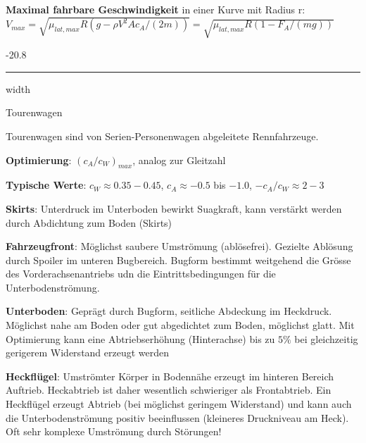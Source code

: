 \documentclass[8pt, landscape, fleqn]{scrartcl}
\makeatletter
\renewcommand{\subsubsection}{\@startsection{subsubsection}{1}{0mm}%
{-2\baselineskip}{0.8\baselineskip}%
{\hrule depth 0.2pt width\columnwidth\vspace*{1.2em}\normalsize\bfseries\rmfamily}}
\makeatother
\begin{document}
\begin{multicols*}{3}
\textbf{Maximal fahrbare Geschwindigkeit} in einer Kurve mit Radius r:
$V_{max} = \sqrt{\mu_{lat,max}R(g-\rho V^2 A c_A / (2m))} = \sqrt{\mu_{lat,max} R (1- F_A/(mg))}$

\subsubsection{Tourenwagen}

Tourenwagen sind von Serien-Personenwagen abgeleitete Rennfahrzeuge. \newline \newline

\textbf{Optimierung}: $(c_A / c_W)_{max}$, analog zur Gleitzahl \newline \newline

\textbf{Typische Werte}: $c_W \approx 0.35 - 0.45$, $c_A \approx -0.5$ bis $-1.0$, $-c_A/c_W \approx 2-3$ \newline \newline

\textbf{Skirts}: Unterdruck im Unterboden bewirkt Suagkraft, kann verstärkt werden durch Abdichtung zum Boden (Skirts) \newline \newline

\textbf{Fahrzeugfront}: Möglichst saubere Umströmung (ablösefrei). Gezielte Ablösung durch Spoiler im unteren Bugbereich. Bugform bestimmt weitgehend die Grösse des Vorderachsenantriebs udn die Eintrittsbedingungen für die Unterbodenströmung.  \newline \newline

\textbf{Unterboden}: Geprägt durch Bugform, seitliche Abdeckung im Heckdruck. Möglichst nahe am Boden oder gut abgedichtet zum Boden, möglichst glatt. Mit Optimierung kann eine Abtriebserhöhung (Hinterachse) bis zu $5\%$ bei gleichzeitig gerigerem Widerstand erzeugt werden \newline \newline

\textbf{Heckflügel}: Umströmter Körper in Bodennähe erzeugt im hinteren Bereich Auftrieb. Heckabtrieb ist daher wesentlich schwieriger als Frontabtrieb. Ein Heckflügel
erzeugt Abtrieb (bei möglichst geringem Widerstand) und kann auch die Unterbodenströmung positiv beeinflussen (kleineres Druckniveau am Heck). Oft sehr komplexe Umströmung durch Störungen! \newline \newline


\end{multicols*}
\end{document}
